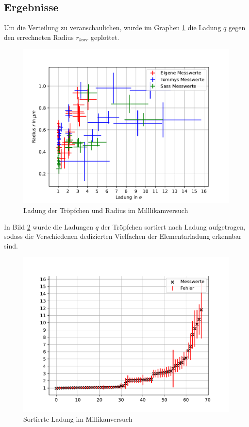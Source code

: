 \documentclass[11pt, a4paper]{article}
\begin{document}
    \subsection{Ergebnisse}
    Um die Verteilung zu veranschaulichen, wurde im Graphen \ref{fig:milllikam} die Ladung $q$ gegen den errechneten Radius $r_{korr}$ geplottet.
    \begin{figure}[h]
        \centering
        \includegraphics[width=\textwidth]{millikan.pdf}
        \caption{Ladung der Tröpfchen und Radius im Milllikamversuch}
        \label{fig:milllikam}
    \end{figure}

    In Bild \ref{fig:miliq} wurde die Ladungen $q$ der Tröpfchen sortiert nach Ladung aufgetragen, sodass die Verschiedenen dedizierten Vielfachen der Elementarladung erkennbar sind.

    \begin{figure}[h]
        \centering
        \includegraphics[width=\textwidth]{millikan_q.pdf}
        \caption{Sortierte Ladung im Millikanversuch}
        \label{fig:miliq}
    \end{figure}
\end{document}
